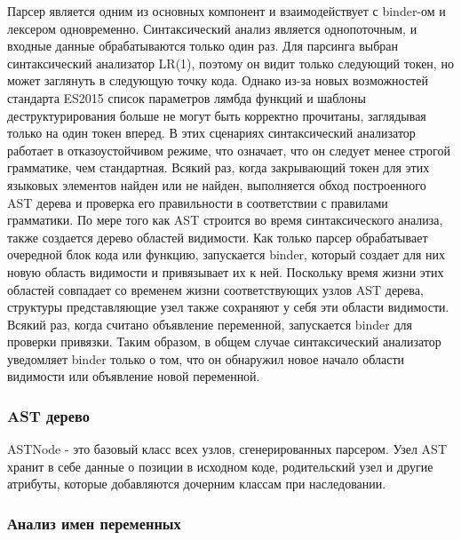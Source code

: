 Парсер является одним из основных компонент и взаимодействует с binder-ом и лексером одновременно.
Синтаксический анализ является однопоточным, и входные данные обрабатываются только один раз.
Для парсинга выбран синтаксический анализатор LR(1), поэтому он видит только следующий токен,
но может заглянуть в следующую точку кода.
Однако из-за новых возможностей стандарта ES2015 список параметров лямбда функций и шаблоны деструктурирования
больше не могут быть корректно прочитаны, заглядывая только на один токен вперед.
В этих сценариях синтаксический анализатор работает в отказоустойчивом режиме, что означает,
что он следует менее строгой грамматике, чем стандартная.
Всякий раз, когда закрывающий токен для этих языковых элементов найден или не найден, выполняется обход построенного AST
дерева и проверка его правильности в соответствии с правилами грамматики.
По мере того как AST строится во время синтаксического анализа, также создается дерево областей видимости.
Как только парсер обрабатывает очередной блок кода или функцию, запускается binder, который создает для них новую область
видимости и привязывает их к ней.
Поскольку время жизни этих областей совпадает со временем жизни соответствующих узлов AST дерева,
структуры представляющие узел также сохраняют у себя эти области видимости.
Всякий раз, когда считано объявление переменной, запускается binder для проверки привязки.
Таким образом, в общем случае синтаксический анализатор уведомляет binder только о том, что он обнаружил
новое начало области видимости или объявление новой переменной.

\subsubsection{AST дерево}

ASTNode - это базовый класс всех узлов, сгенерированных парсером.
Узел AST хранит в себе данные о позиции в исходном коде, родительский узел и другие атрибуты,
которые добавляются дочерним классам при наследовании.

\subsubsection{Анализ имен переменных}

